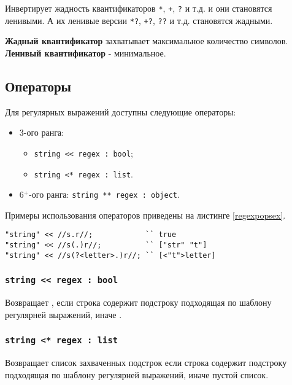 \documentclass[a4paper, 14pt]{extarticle}
\newenvironment{icItems}
	{ \begin{itemize} [noitemsep,nolistsep] }
	{ \end{itemize} }
\begin{document}
Инвертирует жадность квантификаторов \lstinline|*|, \lstinline|+|, \lstinline|?| и т.д. и они становятся ленивыми. А их ленивые версии \lstinline|*?|, \lstinline|+?|, \lstinline|??| и т.д. становятся жадными.

{\bf Жадный квантификатор} захватывает максимальное количество символов. {\bf Ленивый квантификатор} - минимальное.

\subsection{Операторы}

Для регулярных выражений доступны следующие операторы:
\begin{icItems}
\item
	3-ого ранга:
	\begin{icItems}
	\item
		\lstinline|string << regex : bool|;
	\item
		\lstinline|string <* regex : list|.
	\end{icItems}

\item 
	6$^+$-ого ранга: \lstinline|string ** regex : object|.
\end{icItems}

Примеры использования операторов приведены на листинге \ref{regexpopsex}.

\begin{lstlisting}[caption=Операторы регулярных выражений, label=regexpopsex]
"string" << //s.r//;            `` true
"string" << //s(.)r//;          `` ["str" "t"]
"string" << //s(?<letter>.)r//; `` [<"t">letter]
\end{lstlisting}

\subsubsection{\lstinline|string << regex : bool|}

Возвращает \true{}, если строка содержит подстроку подходящая по шаблону регулярней выражений, иначе \false{}.

\subsubsection{\lstinline|string <* regex : list|}

Возвращает список захваченных подстрок если строка содержит подстроку подходящая по шаблону регулярней выражений, иначе пустой список.
\end{document}
